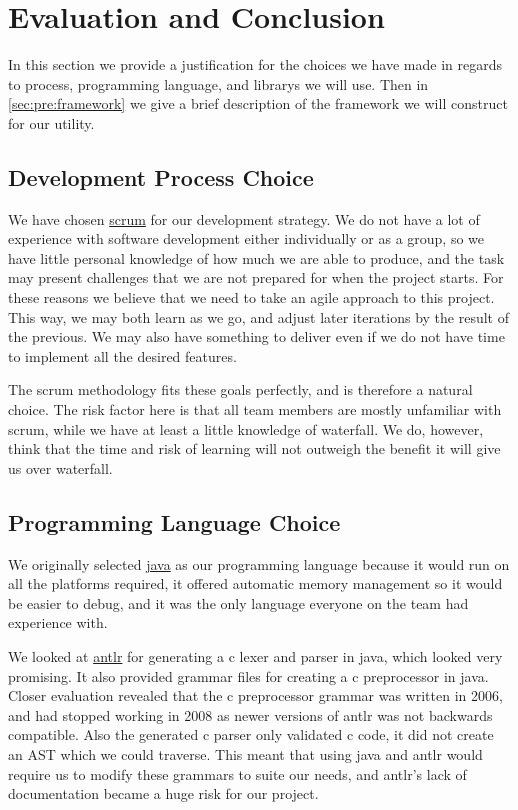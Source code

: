 \section{Evaluation and Conclusion}
\label{sec:pre:eval}
In this section we provide a justification for the choices we have made in
regards to process, programming language, and \glspl{library} we will use. Then
in \autoref{sec:pre:framework} we give a brief description of the framework
we will construct for our \gls{utility}.

\subsection{Development Process Choice}
\label{sec:pre:devchoice}
We have chosen \hyperref[sec:pre:scrum]{\Gls{scrum}} for our development strategy.
We do not have a lot of experience with software development either
individually or as a group, so we have little personal knowledge of how much
we are able to produce, and the task may present challenges that we are not
prepared for when the project starts. For these reasons we believe that we
need to take an agile approach to this project. This way, we may both learn as
we go, and adjust later iterations by the result of the previous. We may also
have something to deliver even if we do not have time to implement all the
desired features.

The \Gls{scrum} methodology fits these goals perfectly, and is therefore a natural
choice. The risk factor here is that all team members are mostly unfamiliar
with \Gls{scrum}, while we have at least a little knowledge of waterfall. We do,
however, think that the time and risk of learning will not outweigh
the benefit it will give us over waterfall.

\subsection{Programming Language Choice}
\label{sec:pre:langchoice}
We originally selected \hyperref[sec:pre:java]{\Gls{java}} as our programming
language because it would run on all the platforms required, it offered
automatic memory management so it would be easier to debug, and it was the only
language everyone on the team had experience with.

We looked at \hyperref[sec:pre:antlr]{\gls{antlr}} for generating a
\Gls{c} \gls{lexer} and \gls{parser} in \Gls{java}, which looked very promising. It also provided
grammar files for creating a \Gls{c} \gls{preprocessor} in \Gls{java}. Closer evaluation revealed
that the \Gls{c} \gls{preprocessor} grammar was written in 2006, and had stopped working in
2008 as newer versions of \gls{antlr} was not backwards compatible. Also the
generated \Gls{c} \gls{parser} only validated \Gls{c} code, it did not create an \gls{AST} which we could traverse.
This meant that using \Gls{java} and \gls{antlr} would
require us to modify these grammars to suite our needs, and \gls{antlr}'s lack of
documentation became a huge risk for our project.

